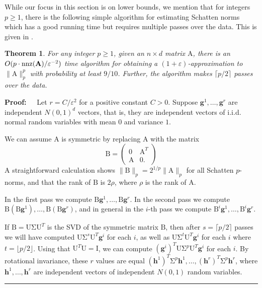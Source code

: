 \documentclass[11pt]{article}
\newtheorem{theorem}{Theorem}
\newenvironment{proof}{\begin{trivlist} \item {\bf Proof:~~}}
  {\qed\end{trivlist}}
\newcommand{\mat}[1]{{\ensuremath{\bm{\mathrm{#1}}}}}
\def\matA{\mat{A}}
\def\matB{\mat{B}}
\def\matI{\mat{I}}
\def\matU{\mat{U}}
\def\nnz{{ \rm nnz }}
\def\qed{\hfill\rule{2mm}{2mm}}
\def\g{{\mathbf g}}
\def\h{{\mathbf h}}
\newcommand{\eps}{\varepsilon}
\begin{document}
While our focus in this section is on lower bounds, we mention that for integers $p \geq 1$, there
is the following simple algorithm for estimating Schatten norms which has a good running time but requires multiple passes over
the data. This is given in \cite{lnw14}. 
\begin{theorem}
For any integer $p \geq 1$, given an $n \times d$ matrix $\matA$, 
there is an $O(p \cdot \nnz(\matA)/\eps^{-2})$ time algorithm for obtaining a $(1+\eps)$-approximation to
$\|\matA\|_p^p$ with probability at least $9/10$. Further,
the algorithm makes $\lceil p/2 \rceil$ passes over the data. 
\end{theorem}
\begin{proof}
Let $r = C/\eps^2$ for a positive constant $C > 0$. 
Suppose $\g^1, \ldots, \g^{r}$ are independent $N(0,1)^d$ vectors, that is, they are independent
vectors of i.i.d. normal random variables with mean $0$ and variance $1$. 

We can assume $\matA$ is symmetric by replacing $\matA$ with the matrix
\[ \matB = \left ( \begin{array}{cc}
0 & \matA^T\\
\matA & 0 .\end{array} \right ) \]
A straightforward calculation shows $\|\matB\|_p = 2^{1/p} \|\matA\|_p$ for all Schatten $p$-norms, and
that the rank of $\matB$ is $2\rho$, where $\rho$ is the rank of $\matA$.

In the first pass we compute $\matB \g^1, \ldots, \matB \g^r$. In the second pass we compute $\matB(\matB \g^1), \ldots, \matB(\matB \g^r)$, and
in general in the $i$-th pass we compute $\matB^i\g^1, \ldots, \matB^i\g^r$. 

If $\matB = \matU \mat\Sigma \matU^T$ is the SVD
of the symmetric matrix $\matB$, 
then after $s = \lceil p/2 \rceil$ passes we will have computed $\matU \mat\Sigma^s \matU^T\g^i$ for each $i$,
as well as $\matU \mat\Sigma^t\matU^T \g^i$ for each $i$ where $t = \lfloor p/2 \rfloor$. Using that $\matU^T\matU = \matI$,
we can compute $(\g^i)^T\matU\mat\Sigma^p\matU^T\g^i$ for each $i$. By rotational invariance, these $r$
values are equal $(\h^1)^T \mat\Sigma^p \h^1, \ldots, (\h^r)^T \mat\Sigma^p \h^r$, where $\h^1, \ldots, \h^r$ are 
independent vectors of independent $N(0,1)$ random variables. 


\end{proof}
\end{document}
